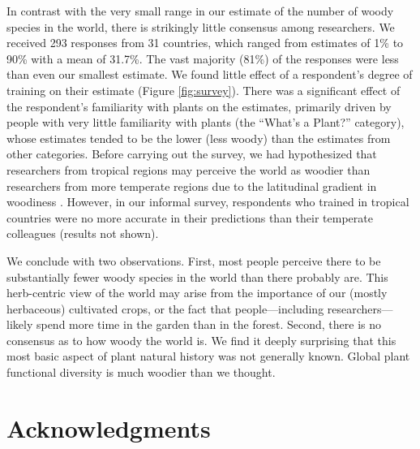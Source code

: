 \documentclass[12pt]{article}
\begin{document}
In contrast with the very small range in our estimate of the number of
woody species in the world, there is strikingly little consensus among
researchers.  We received 293 responses from 31 countries, which
ranged from estimates of 1\% to 90\% with a mean of 31.7\%.  The vast
majority (81\%) of the responses were less than even our smallest
estimate.
We found little effect of a respondent's degree of training on their
estimate (Figure \ref{fig:survey}).  There was a significant effect of
the respondent's familiarity with plants on the estimates, primarily
driven by people with very little familiarity with plants (the
``What's a Plant?'' category), whose estimates tended to be the lower
(less woody) than the estimates from other categories.
% 
Before carrying out the survey, we had hypothesized that researchers
from tropical regions may perceive the world as woodier than
researchers from more temperate regions due to the latitudinal
gradient in woodiness \citep{Molesheihgt}.  However, in our informal
survey, respondents who trained in tropical countries were no more
accurate in their predictions than their temperate colleagues (results
not shown).

We conclude with two observations.  
%
First, most people perceive there to be substantially fewer woody
species in the world than there probably are.  This herb-centric
view of the world may arise from the importance of our (mostly
herbaceous) cultivated crops, or the fact that people---including researchers---likely
spend more time in the garden than in the forest.
%
Second, there is no consensus as to how woody the world is.  We find
it deeply surprising that this most basic aspect of plant natural
history was not generally known.  Global plant functional diversity is
much woodier than we thought.

\section{Acknowledgments}
\end{document}
